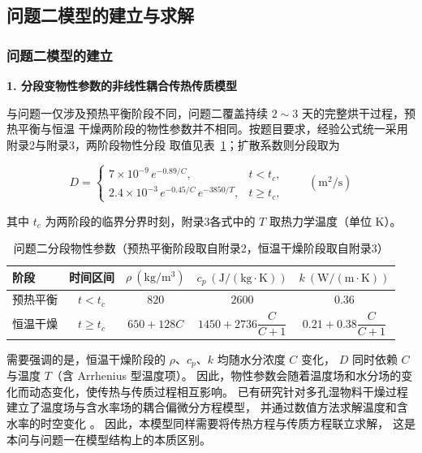 \documentclass[12pt,a4paper]{ctexart}
\begin{document}
\subsection{问题二模型的建立与求解}
\subsubsection{问题二模型的建立}

\textbf{1. 分段变物性参数的非线性耦合传热传质模型}

与问题一仅涉及预热平衡阶段不同，问题二覆盖持续 $2\sim3$ 天的完整烘干过程，预热平衡与恒温
干燥两阶段的物性参数并不相同。按题目要求，经验公式统一采用附录2与附录3，两阶段物性分段
取值见表~\ref{tab:p2param}；扩散系数则分段取为

\begin{equation}
D=\begin{cases}
7\times10^{-9}\,e^{-0.89/C}, & t<t_c,\\[4pt]
2.4\times10^{-3}\,e^{-0.45/C}\,e^{-3850/T}, & t\ge t_c,
\end{cases}
\qquad(\mathrm{m^2/s})
\label{eq:p2D}
\end{equation}

其中 $t_c$ 为两阶段的临界分界时刻，附录3各式中的 $T$ 取热力学温度（单位 K）。

\begin{table}[H]
\centering
\small
\begin{tabular}{lcccc}
\toprule
阶段 & 时间区间 & $\rho\ (\mathrm{kg/m^3})$ & $c_p\ (\mathrm{J/(kg\cdot K)})$ &
$k\ (\mathrm{W/(m\cdot K)})$ \\
\midrule
预热平衡 & $t<t_c$ & $820$ & $2600$ & $0.36$ \\
恒温干燥 & $t\ge t_c$ & $650+128C$ & $1450+2736\dfrac{C}{C+1}$ &
$0.21+0.38\dfrac{C}{C+1}$ \\
\bottomrule
\end{tabular}
\caption{问题二分段物性参数（预热平衡阶段取自附录2，恒温干燥阶段取自附录3）}
\label{tab:p2param}
\end{table}

需要强调的是，恒温干燥阶段的 $\rho$、$c_p$、$k$ 均随水分浓度 $C$ 变化，
$D$ 同时依赖 $C$ 与温度 $T$（含 Arrhenius 型温度项）。
因此，物性参数会随着温度场和水分场的变化而动态变化，使传热与传质过程相互影响。
已有研究针对多孔湿物料干燥过程建立了温度场与含水率场的耦合偏微分方程模型，
并通过数值方法求解温度和含水率的时空变化
\cite{ref5}。
因此，本模型同样需要将传热方程与传质方程联立求解，
这是本问与问题一在模型结构上的本质区别。
\end{document}
